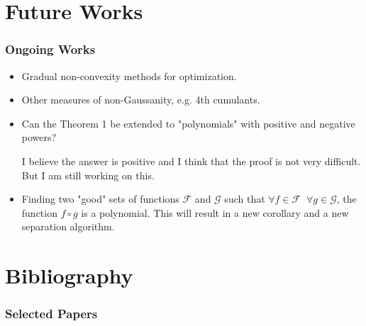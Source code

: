 \documentclass[usenames,dvipsnames]{beamer}
\begin{document}
\section{Future Works}

\begin{frame}
\frametitle{Ongoing Works}
\begin{itemize}
\item Gradual non-convexity methods for optimization.
\pause
\item Other measures of non-Gaussanity, e.g. 4th cumulants.
\pause
\item Can the Theorem 1 be extended to "polynomials" with positive and negative powers? 

{\color{red}\small{I believe the answer is positive and I think that the proof is not very difficult. But I am still working on this.}}
\pause
\normalsize
\item Finding two "good" sets of functions $\mathcal{F}$ and $\mathcal{G}$ such that $\forall f\in \mathcal{F} \;\; \forall g \in \mathcal{G}$, the function  $f\circ g $ is a polynomial. This will result in a new corollary and a new separation algorithm.

\end{itemize}
\end{frame}


\section{Bibliography}
\begin{frame}[t, allowframebreaks]
\frametitle{Selected Papers}
\scriptsize{

\nocite{shahram,TCL, PCL, newHyva, comon2010handbook, babaie2005general,linnik1968remark,kagan1973characterization, hyvarinen2000independent, ehsandoust}

}
\end{frame}




\end{document}
